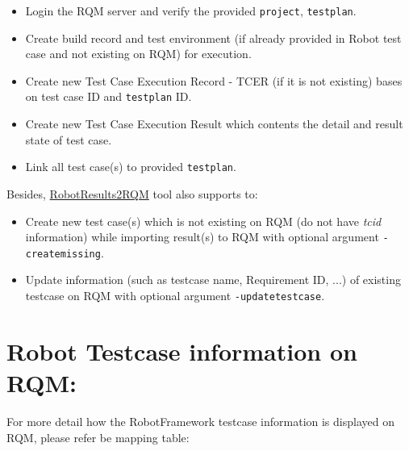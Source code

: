 \begin{itemize}
\tightlist
\item
  Login the RQM server and verify the provided \texttt{project},
  \texttt{testplan}.
\item
  Create build record and test environment (if already provided in Robot
  test case and not existing on RQM) for execution.
\item
  Create new Test Case Execution Record - TCER (if it is not existing)
  bases on test case ID and \texttt{testplan} ID.
\item
  Create new Test Case Execution Result which contents the detail and
  result state of test case.
\item
  Link all test case(s) to provided \texttt{testplan}.
\end{itemize}

Besides,
\href{https://github.com/test-fullautomation/robotframework-testresult2rqmtool}{RobotResults2RQM}
tool also supports to:

\begin{itemize}
\tightlist
\item
  Create new test case(s) which is not existing on RQM (do not have
  \emph{tcid} information) while importing result(s) to RQM with
  optional argument \texttt{-createmissing}.
\item
  Update information (such as testcase name, Requirement ID, ...) of
  existing testcase on RQM with optional argument
  \texttt{-updatetestcase}.
\end{itemize}

\hypertarget{description-robot-testcase-information-on-rqm}{%
\section{Robot Testcase information on
RQM:}\label{description-robot-testcase-information-on-rqm}}

For more detail how the RobotFramework testcase information is displayed
on RQM, please refer be mapping table:

